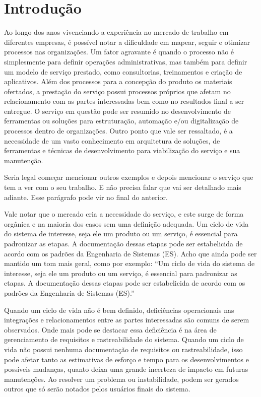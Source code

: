 
\chapter{Introdução}\label{chap:introducao} %

	Ao longo dos anos vivenciando a experiência no mercado de trabalho em diferentes 
	empresas, é possível notar a dificuldade em mapear, seguir e otimizar processos 
	nas organizações. Um fator agravante é quando o processo não é simplesmente 
	para definir operações administrativas, mas também para definir um modelo de 
	serviço prestado,{\color{blue} como consultorias, treinamentos e criação de aplicativos. Além 
	dos processos para a concepção do produto os materiais ofertados, a prestação do 
	serviço possui processos próprios que afetam no relacionamento com as partes interessadas
	bem como no resultados final a ser entregue.} O serviço em questão pode ser resumido no desenvolvimento de 
	ferramentas ou soluções para estruturação, automação e/ou digitalização de processos dentro 
	de organizações. Outro ponto que vale ser ressaltado, é a necessidade de um vasto conhecimento 
	em arquitetura de soluções, de ferramentas e técnicas de desenvolvimento para 
	viabilização do serviço e sua manutenção.

	{\color{green} Seria legal começar mencionar outros exemplos e depois mencionar o serviço que tem a ver com o seu trabalho. E não precisa falar que vai ser detalhado mais adiante.}
	{\color{green} Esse parágrafo pode vir no final do anterior.}

	Vale notar que o mercado cria a necessidade do serviço, e este 
	surge de forma orgânica e na maioria dos casos sem uma definição adequada. Um ciclo 
	de vida do sistema de interesse, seja ele um produto ou um serviço, é essencial para 
	padronizar as etapas. A documentação dessas etapas pode ser estabelicida de acordo com 
	os padrões da Engenharia de Sistemas (ES). 
	{\color{green} Acho que ainda pode ser mantido 
	um tom mais geral, como por exemplo: ``Um ciclo de vida do sistema de interesse, seja ele um produto ou um serviço, é essencial para padronizar as etapas. A documentação dessas etapas pode ser estabelicida de acordo com os padrões da Engenharia de Sistemas (ES).''}

	Quando um ciclo de vida não é bem definido, deficiências operacionais nas integrações 
	e relacionamentos entre as partes interessadas são comuns de serem observados. 
	Onde mais pode se destacar essa deficiência é na área de gerenciamento de requisitos e 
	rastreabilidade do sistema. Quando um ciclo de vida não possui nenhuma documentação de 
	requisitos ou rastreabilidade, isso pode afetar tanto as estimativas de esforço e tempo 
	para os desenvolvimentos e possíveis mudanças, quanto deixa uma grande incerteza de impacto 
	em futuras manutenções. Ao resolver um problema ou instabilidade, podem ser gerados outros 
	que só serão notados pelos usuários finais do sistema.
	

